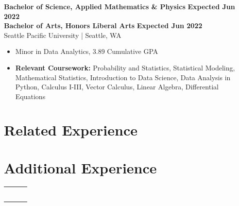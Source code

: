 \documentclass{article}
\begin{document}
    \textbf{Bachelor of Science, Applied Mathematics \& Physics} \hfill \textbf{Expected Jun 2022}\\
    \textbf{Bachelor of Arts, Honors Liberal Arts} \hfill \textbf{Expected Jun 2022}\\
    Seattle Pacific University | Seattle, WA 
        \squish
        \begin{itemize} \setlength\itemsep{-2pt}
            \item Minor in Data Analytics, 3.89 Cumulative GPA
            \item 
            \textbf{Relevant Coursework:} Probability and Statistics, Statistical Modeling, Mathematical Statistics, Introduction to Data Science, Data Analysis in Python, Calculus I-III, Vector Calculus, Linear Algebra, Differential Equations
        \end{itemize}



\section{Related Experience}

    
    
    
        


\section{Additional Experience}

    \begin{flushleft}
        \begin{tabularx}{\textwidth}{l l R}
                      \\
                         \\
              \\
                    \\
                             \\
                     \\
        \end{tabularx}
    \end{flushleft}
\end{document}
